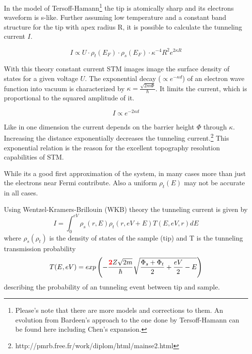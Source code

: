 In the model of Tersoff-Hamann\footnote{Please's note that there are more models and corrections to them. An evolution from Bardeen's approach to the one done by Tersoff-Hamann can be found here \cite{lounis_theory_2014, wortmann_interpretation_2000} including Chen's expansion.} the tip is atomically sharp and its electrons waveform is s-like. Further assuming low temperature and a constant band structure for the tip with apex radius R, it is possible to calculate the tunneling current $I$. 

$$I \propto U \cdot \rho_t(E_F) \cdot \rho_s(E_F) \cdot \kappa^{-4}R^2e^{2\kappa R} $$

With this theory constant current STM images image the surface density of states for  a given voltage $U$. The exponential decay ($\propto e^{-\kappa d}$) of an electron wave function into vacuum is characterized by $\kappa=\frac{\sqrt{2m\Phi}}{\hbar}$. It limits the current, which is proportional to the squared amplitude of it. 

$$I\propto e^{-2\kappa d}$$

Like in one dimension the current depends on the barrier height $\Phi$ through $\kappa$. Increasing the distance exponentially decreases the tunneling current.\footnote{http://pmrb.free.fr/work/diplom/html/mainse2.html} This exponential relation is the reason for the excellent topography resolution capabilities of STM.

While its a good first approximation of the system, in many cases more than just the electrons near Fermi contribute. Also a uniform $\rho_t(E)$ may not be accurate in all cases.

Using  Wentzel-Kramers-Brillouin (WKB) theory\cite{wentzel_verallgemeinerung_1926, kramers_wellenmechanik_1926, brillouin_mecanique_1926} the tunneling current is given by
\begin{equation}
I=\int_0^{eV}\rho_s(r,E)\rho_t(r,eV+E)T(E,eV,r)dE
\label{WKB}
\end{equation}
where $\rho_s(\rho_t)$ is the density of states of the sample (tip) and T is the tunneling transmission probability
\begin{equation}
T(E,eV)=exp\left(-\frac{\textcolor{red}{\textbf{2}}Z\sqrt{2m}}{\hbar}\sqrt{\frac{\Phi_s+\Phi_t}{2}+\frac{eV}{2}-E}\right)
\label{Transmission-function} 
\end{equation}
describing the probability of an tunneling event between tip and sample.

